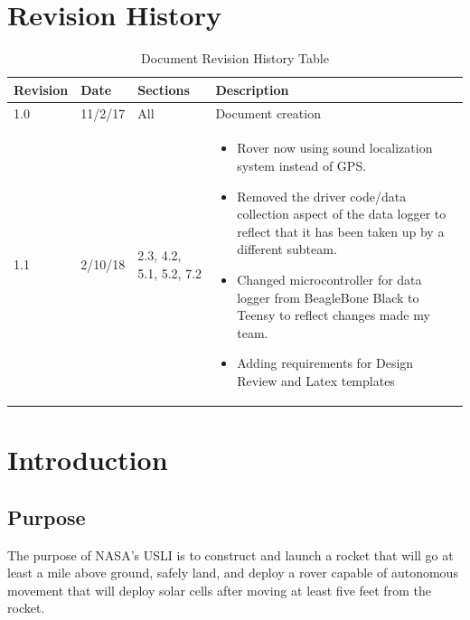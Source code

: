 \documentclass[onecolumn, draftclsnofoot, 10pt, compsoc]{IEEEtran}
\date{}
\begin{document}

\tableofcontents

\section{Revision History}
\begin{table}[h]
\centering
\caption{Document Revision History Table}
\label{table:Revision History}
\begin{tabular}{@{}lllp{12cm}@{}}
\toprule
\textbf{Revision}    & \textbf{Date}            & \textbf{Sections}  & \textbf{Description}                                                                                                                                             \\ \midrule
1.0                  & 11/2/17                  & All               & Document creation                                                                                                                                                \\ \midrule
1.1 & 2/10/18 & 2.3, 4.2, 5.1, 5.2, 7.2 & \vspace{-15pt} \begin{itemize} \item Rover now using sound localization system instead of GPS. \item Removed the driver code/data collection aspect of the data logger to reflect that it has been taken up by a different subteam. \item Changed microcontroller for data logger from BeagleBone Black to Teensy to reflect changes made my team.\item Adding requirements for Design Review and Latex templates \end{itemize} \vspace{-15pt} \\ \bottomrule
\end{tabular}
\end{table}

\section{Introduction}

\subsection{Purpose}
The purpose of NASA's USLI is to construct and launch a rocket that will go at least a mile above ground, safely land, and deploy a rover capable of autonomous movement that will deploy solar cells after moving at least five feet from the rocket.
\end{document}
